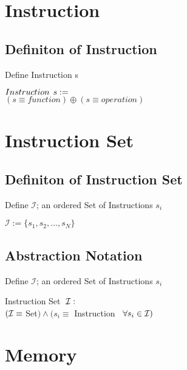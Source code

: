 \documentclass[11pt]{article}
\begin{document}
\section{Instruction}
\subsection{Definiton of Instruction}
Define Instruction s
\begin{center}
$
Instruction \hspace{1.5mm} s :=
$
\\ \vspace{2mm}
$
(s \equiv function) \oplus (s \equiv operation)
$
\end{center}

\section{Instruction Set}
\subsection{Definiton of Instruction Set}
Define $\mathcal{I}$; an ordered Set of Instructions $s_i$
\begin{center}
$
\mathcal{I} := \{ s_1,s_2,...,s_{N}\}
$
\end{center}



\subsection{Abstraction Notation}
Define $\mathcal{I}$; an ordered Set of Instructions $s_i$
\begin{center}
Instruction Set$ \hspace{2mm} \mathcal{I}:
$
\\ \vspace{2mm}
$
(\mathcal{I} \equiv \hspace{1mm} $Set$) \land (s_i \equiv$ Instruction$ \hspace{3mm} \forall s_i \in \mathcal{I})
$
\end{center}











\newpage

\section{Memory}
\end{document}
